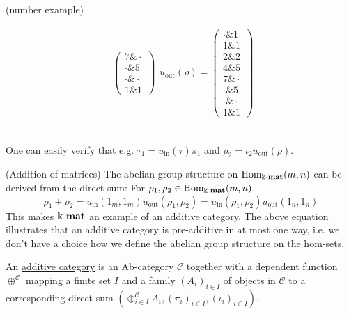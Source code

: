 \begin{example}{(number example)}
\begin{minipage}[t]{.5\textwidth}
\begin{align*}
\begin{array}{rr}
\begin{pmatrix}
7 \ampersand \cdot \\
\cdot \ampersand 5 \\
\cdot \ampersand \cdot \\
1 \ampersand 1
\end{pmatrix}
\end{array}
u_{\text{out}}(\rho) = \begin{pmatrix}
\cdot \ampersand 1 \\
1 \ampersand 1 \\
2 \ampersand 2 \\
4 \ampersand 5 \\
7 \ampersand \cdot \\
\cdot \ampersand 5 \\
\cdot \ampersand \cdot \\
1 \ampersand 1
\end{pmatrix}
\end{align*}
\end{minipage}\\

\noindent One can easily verify that e.g. $\tau_{1} = u_{\mathrm{in}}(\tau) \pi_{1}$ and $\rho_{2} = \iota_{2} u_{\mathrm{out}}(\rho)$.
\end{example}

\begin{remark}{(Addition of matrices)}
The abelian group structure on $\mathrm{Hom}_{\Bbbk\textnormal{-}\mathbf{mat}}(m,n)$ can be derived from the direct sum:
For $\rho_{1}, \rho_{2} \in \mathrm{Hom}_{\Bbbk\textnormal{-}\mathbf{mat}}(m,n)$
\[
\rho_{1} + \rho_{2} = u_{\mathrm{in}}(1_{m},1_{m}) u_{\mathrm{out}}(\rho_{1},\rho_{2}) 
= u_{\mathrm{in}}(\rho_{1},\rho_{2})u_{\mathrm{out}}(1_{n},1_{n})
\]
This makes $\Bbbk\textnormal{-}\mathbf{mat}$ an example of an additive category. The above equation illustrates that an additive category is
pre-additive in at most one way, i.e. we don't have a choice how we define the abelian group structure on the hom-sets.
\end{remark}

\begin{definition}\label{def:additive_category}
An \ul{additive category} is an Ab-category $\mathcal{C}$ together with a dependent function $\oplus^{\mathcal{C}}$ mapping
a finite set $I$ and a family $(A_{i})_{i\in I}$ of objects in $\mathcal{C}$ to a corresponding direct sum $(\oplus_{i\in I}^{\mathcal{C}} A_{i},
(\pi_{i})_{i\in I}, (\iota_{i})_{i\in I})$.
\end{definition}



